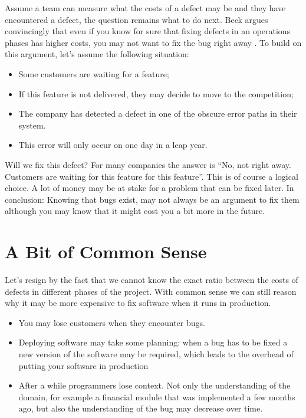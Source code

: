 Assume a team can measure what the costs of a defect may be and they have encountered a defect, the question remains what to do next.
Beck argues convincingly that even if you know for sure that fixing defects in an operations phases has higher costs, you may not want to fix the bug right away \autocite[22]{beck2000extreme}.
To build on this argument, let's assume the following situation:
\begin{itemize}[noitemsep]
\item Some customers are waiting for a feature;
\item If this feature is not delivered, they may decide to move to the competition;
\item The company has detected a defect in one of the obscure error paths in their system.
\item This error will only occur on one day in a leap year.
\end{itemize}
Will we fix this defect? For many companies the answer is ``No, not right away. Customers are waiting for this feature for this feature''.
This is of course a logical choice. A lot of money may be at stake for a problem that can be fixed later.
In conclusion: Knowing that bugs exist, may not always be an argument to fix them although you may know that it might cost you a bit more in the future.

\section*{A Bit of Common Sense}

Let's resign by the fact that we cannot know the exact ratio between the costs of defects in different phases of the project.
With common sense we can still reason why it may be more expensive to fix software when it runs in production.

\begin{itemize}[noitemsep]
\item You may lose customers when they encounter bugs.
\item Deploying software may take some planning: when a bug has to be fixed a new version of the software may be required, which leads to the overhead of putting your software in production
\item After a while programmers lose context. Not only the understanding of the domain, for example a financial module that was implemented a few months ago, but also the understanding of the bug may decrease over time.
\end{itemize}

